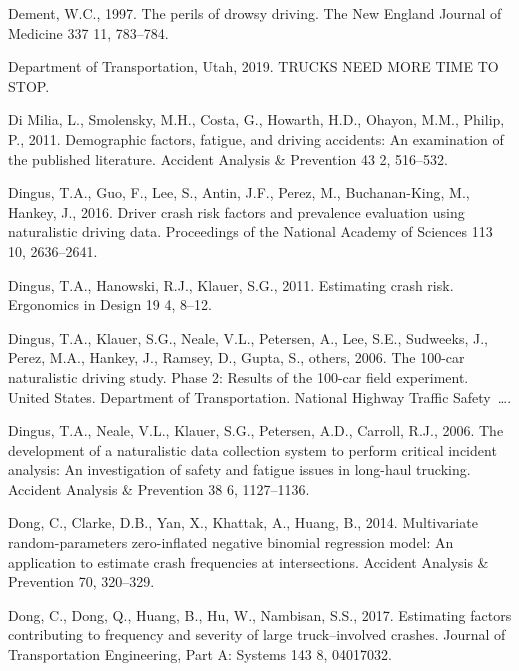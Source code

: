 \documentclass[12pt]{book}
\numberwithin{equation}{chapter}
\begin{document}
\leavevmode\hypertarget{ref-dement1997perils}{}%
Dement, W.C., 1997. The perils of drowsy driving. The New England Journal of Medicine 337 11, 783--784.

\leavevmode\hypertarget{ref-utah2019}{}%
Department of Transportation, Utah, 2019. TRUCKS NEED MORE TIME TO STOP.

\leavevmode\hypertarget{ref-di2011demographic}{}%
Di Milia, L., Smolensky, M.H., Costa, G., Howarth, H.D., Ohayon, M.M., Philip, P., 2011. Demographic factors, fatigue, and driving accidents: An examination of the published literature. Accident Analysis \& Prevention 43 2, 516--532.

\leavevmode\hypertarget{ref-dingus2016driver}{}%
Dingus, T.A., Guo, F., Lee, S., Antin, J.F., Perez, M., Buchanan-King, M., Hankey, J., 2016. Driver crash risk factors and prevalence evaluation using naturalistic driving data. Proceedings of the National Academy of Sciences 113 10, 2636--2641.

\leavevmode\hypertarget{ref-dingus2011estimating}{}%
Dingus, T.A., Hanowski, R.J., Klauer, S.G., 2011. Estimating crash risk. Ergonomics in Design 19 4, 8--12.

\leavevmode\hypertarget{ref-dingus2006100}{}%
Dingus, T.A., Klauer, S.G., Neale, V.L., Petersen, A., Lee, S.E., Sudweeks, J., Perez, M.A., Hankey, J., Ramsey, D., Gupta, S., others, 2006. The 100-car naturalistic driving study. Phase 2: Results of the 100-car field experiment. United States. Department of Transportation. National Highway Traffic Safety~\ldots{}.

\leavevmode\hypertarget{ref-dingus2006development}{}%
Dingus, T.A., Neale, V.L., Klauer, S.G., Petersen, A.D., Carroll, R.J., 2006. The development of a naturalistic data collection system to perform critical incident analysis: An investigation of safety and fatigue issues in long-haul trucking. Accident Analysis \& Prevention 38 6, 1127--1136.

\leavevmode\hypertarget{ref-dong2014multivariate}{}%
Dong, C., Clarke, D.B., Yan, X., Khattak, A., Huang, B., 2014. Multivariate random-parameters zero-inflated negative binomial regression model: An application to estimate crash frequencies at intersections. Accident Analysis \& Prevention 70, 320--329.

\leavevmode\hypertarget{ref-dong2017estimating}{}%
Dong, C., Dong, Q., Huang, B., Hu, W., Nambisan, S.S., 2017. Estimating factors contributing to frequency and severity of large truck--involved crashes. Journal of Transportation Engineering, Part A: Systems 143 8, 04017032.
\end{document}
